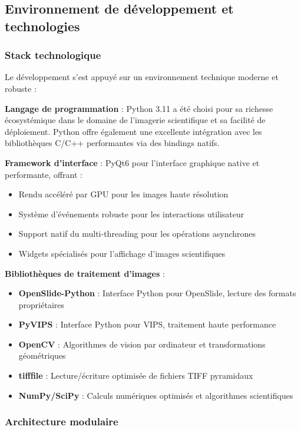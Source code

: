 \documentclass[12pt,a4paper]{report}
\begin{document}
\subsection{Environnement de développement et technologies}

\subsubsection{Stack technologique}

Le développement s'est appuyé sur un environnement technique moderne et robuste :

\textbf{Langage de programmation} : Python 3.11 a été choisi pour sa richesse écosystémique dans le domaine de l'imagerie scientifique et sa facilité de déploiement. Python offre également une excellente intégration avec les bibliothèques C/C++ performantes via des bindings natifs.

\textbf{Framework d'interface} : PyQt6 pour l'interface graphique native et performante, offrant :
\begin{itemize}
\item Rendu accéléré par GPU pour les images haute résolution
\item Système d'événements robuste pour les interactions utilisateur
\item Support natif du multi-threading pour les opérations asynchrones
\item Widgets spécialisés pour l'affichage d'images scientifiques
\end{itemize}

\textbf{Bibliothèques de traitement d'images} :
\begin{itemize}
\item \textbf{OpenSlide-Python} : Interface Python pour OpenSlide, lecture des formats propriétaires
\item \textbf{PyVIPS} : Interface Python pour VIPS, traitement haute performance
\item \textbf{OpenCV} : Algorithmes de vision par ordinateur et transformations géométriques
\item \textbf{tifffile} : Lecture/écriture optimisée de fichiers TIFF pyramidaux
\item \textbf{NumPy/SciPy} : Calculs numériques optimisés et algorithmes scientifiques
\end{itemize}

\subsubsection{Architecture modulaire}
\end{document}
